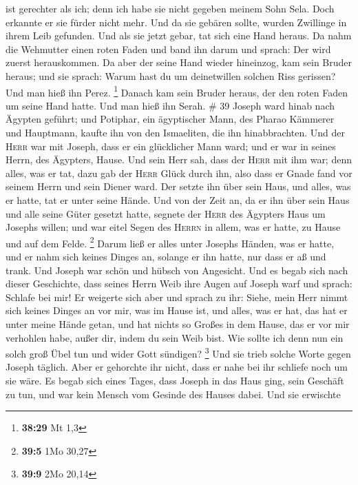 ist gerechter als ich; denn ich habe sie nicht gegeben meinem Sohn Sela.
Doch erkannte er sie fürder nicht mehr.  Und da sie
gebären sollte, wurden Zwillinge in ihrem Leib gefunden. 
Und als sie jetzt gebar, tat sich eine Hand heraus. Da nahm die
Wehmutter einen roten Faden und band ihn darum und sprach: Der wird
zuerst herauskommen.  Da aber der seine Hand wieder
hineinzog, kam sein Bruder heraus; und sie sprach: Warum hast du um
deinetwillen solchen Riss gerissen? Und man hieß ihn Perez. \footnote{\textbf{38:29}
  Mt 1,3}  Danach kam sein Bruder heraus, der den roten
Faden um seine Hand hatte. Und man hieß ihn Serah. \# 39 
Joseph ward hinab nach Ägypten geführt; und Potiphar, ein ägyptischer
Mann, des Pharao Kämmerer und Hauptmann, kaufte ihn von den Ismaeliten,
die ihn hinabbrachten.  Und der \textsc{Herr} war mit
Joseph, dass er ein glücklicher Mann ward; und er war in seines Herrn,
des Ägypters, Hause.  Und sein Herr sah, dass der
\textsc{Herr} mit ihm war; denn alles, was er tat, dazu gab der
\textsc{Herr} Glück durch ihn,  also dass er Gnade fand
vor seinem Herrn und sein Diener ward. Der setzte ihn über sein Haus,
und alles, was er hatte, tat er unter seine Hände.  Und
von der Zeit an, da er ihn über sein Haus und alle seine Güter gesetzt
hatte, segnete der \textsc{Herr} des Ägypters Haus um Josephs willen;
und war eitel Segen des \textsc{Herrn} in allem, was er hatte, zu Hause
und auf dem Felde. \footnote{\textbf{39:5} 1Mo 30,27} 
Darum ließ er alles unter Josephs Händen, was er hatte, und er nahm sich
keines Dinges an, solange er ihn hatte, nur dass er aß und trank. Und
Joseph war schön und hübsch von Angesicht.  Und es begab
sich nach dieser Geschichte, dass seines Herrn Weib ihre Augen auf
Joseph warf und sprach: Schlafe bei mir!  Er weigerte sich
aber und sprach zu ihr: Siehe, mein Herr nimmt sich keines Dinges an vor
mir, was im Hause ist, und alles, was er hat, das hat er unter meine
Hände getan,  und hat nichts so Großes in dem Hause, das
er vor mir verhohlen habe, außer dir, indem du sein Weib bist. Wie
sollte ich denn nun ein solch groß Übel tun und wider Gott sündigen?
\footnote{\textbf{39:9} 2Mo 20,14}  Und sie trieb solche
Worte gegen Joseph täglich. Aber er gehorchte ihr nicht, dass er nahe
bei ihr schliefe noch um sie wäre.  Es begab sich eines
Tages, dass Joseph in das Haus ging, sein Geschäft zu tun, und war kein
Mensch vom Gesinde des Hauses dabei.  Und sie erwischte
